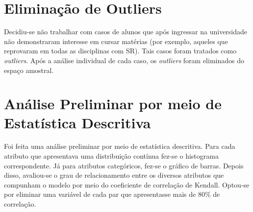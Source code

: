 \section{Eliminação de Outliers}
Decidiu-se não trabalhar com casos de alunos que após ingressar na universidade não
demonstraram interesse em cursar matérias (por exemplo, aqueles que reprovaram em
todas as disciplinas com SR). Tais casos foram tratados como \textit{outliers}.
Após a análise individual de cada caso, os \textit{outliers} foram eliminados do espaço
amostral.

\section{Análise Preliminar por meio de Estatística Descritiva}
Foi feita uma análise preliminar por meio de estatística descritiva. Para cada 
atributo que apresentava uma distribuição contínua fez-se o histograma correspondente.
Já para atributos categóricos, fez-se o gráfico de barras. Depois disso, avaliou-se o
grau de relacionamento entre os diversos atributos que compunham o modelo por meio do
coeficiente de correlação de Kendall. Optou-se por eliminar uma variável de cada par
que apresentasse mais de 80\% de correlação.
